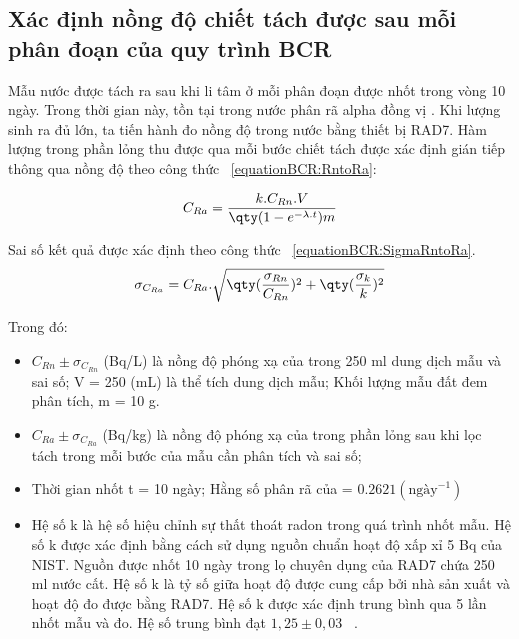         \subsection{Xác định nồng độ  chiết tách được sau mỗi phân đoạn của  quy trình BCR}
    Mẫu nước được tách ra sau khi li tâm ở mỗi phân đoạn được nhốt trong vòng 10 ngày. Trong thời gian này,   tồn tại trong nước phân rã alpha đồng vị . Khi lượng  sinh ra đủ lớn, ta tiến hành đo nồng độ  trong nước bằng thiết bị RAD7.    Hàm lượng  trong phần lỏng thu được qua mỗi bước chiết tách được xác định gián tiếp thông qua nồng độ  theo công thức ~\ref{equationBCR:RntoRa}: 
    
    \begin{equation}
        C_{Ra} = \dfrac{k.C_{Rn}.V}{\qty(1-e^{-\lambda.t})m}
        \label{equationBCR:RntoRa}
    \end{equation}
    
    
    Sai số kết quả được xác định theo công thức ~\ref{equationBCR:SigmaRntoRa}. 
    \begin{equation}
        \sigma_{C_{Ra}} = C_{Ra}.\sqrt{\qty(\dfrac{\sigma_{Rn}}{C_{Rn}})^2 + \qty(\dfrac{\sigma_{k}}{k})^2 }
        \label{equationBCR:SigmaRntoRa}
    \end{equation}
    
    
    Trong đó:
    \begin{itemize}
    \item  $C_{Rn} \pm \sigma_{C_{Rn}}$  (Bq/L) là nồng độ phóng xạ của  trong 250 ml dung dịch mẫu và sai số;  V = 250 (mL) là thể tích dung dịch mẫu; Khối lượng mẫu đất đem phân tích, m = 10 g.
    \item $C_{Ra} \pm \sigma_{C_{Ra}}$ (Bq/kg) là nồng độ phóng xạ của  trong phần lỏng sau khi lọc tách trong mỗi bước của mẫu cần phân tích và sai số;
    \item Thời gian nhốt t = 10 ngày; Hằng số phân rã của  = $0.2621 (\text{ngày}^{-1})$
    \item Hệ số k là hệ số hiệu chỉnh sự thất thoát radon trong quá trình nhốt mẫu. Hệ số k được xác định bằng cách sử dụng nguồn chuẩn  hoạt độ xấp xỉ 5 Bq của NIST. Nguồn được nhốt 10 ngày trong lọ chuyên dụng của RAD7 chứa 250 ml nước cất. Hệ số k là tỷ số giữa hoạt độ được cung cấp bởi nhà sản xuất và hoạt độ đo được bằng RAD7. Hệ số k được xác định trung bình qua 5 lần nhốt mẫu và đo. Hệ số trung bình đạt $1,25 \pm 0,03$ ~\cite{Thesis:HNPThu}. 
    
    \end{itemize}
    

